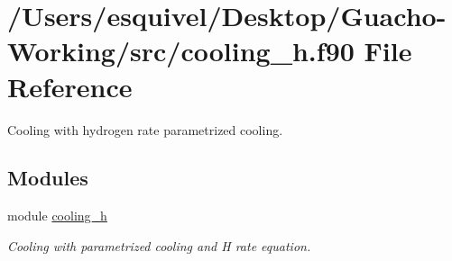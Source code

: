 \hypertarget{cooling__h_8f90}{}\section{/\+Users/esquivel/\+Desktop/\+Guacho-\/\+Working/src/cooling\+\_\+h.f90 File Reference}
\label{cooling__h_8f90}


Cooling with hydrogen rate parametrized cooling.  


\subsection*{Modules}
\begin{DoxyCompactItemize}
\item 
module \hyperlink{namespacecooling__h}{cooling\+\_\+h}
\begin{DoxyCompactList}\small\item\em Cooling with parametrized cooling and H rate equation. \end{DoxyCompactList}\end{DoxyCompactItemize}
